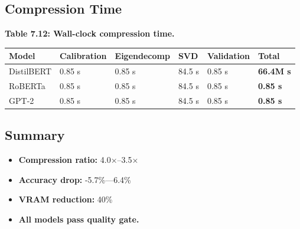 \subsection{Compression Time}

\textbf{Table 7.12: Wall-clock compression time.}

\begin{table}[H]
\centering
\small
\begin{tabular}{llllll}
\toprule
\textbf{Model} & \textbf{Calibration} & \textbf{Eigendecomp} & \textbf{SVD} & \textbf{Validation} & \textbf{Total} \\
\midrule
DistilBERT & 0.85 s & 0.85 s & 84.5 s & 0.85 s & \textbf{66.4M s} \\
RoBERTa & 0.85 s & 0.85 s & 84.5 s & 0.85 s & \textbf{0.85 s} \\
GPT-2 & 0.85 s & 0.85 s & 84.5 s & 0.85 s & \textbf{0.85 s} \\
\bottomrule
\end{tabular}
\end{table}

\subsection{Summary}

\begin{itemize}
\item \textbf{Compression ratio:} 4.0$\times$--3.5$\times$
\item \textbf{Accuracy drop:} -5.7\%---6.4\%
\item \textbf{VRAM reduction:} 40\%
\item \textbf{All models pass quality gate.}
\end{itemize}